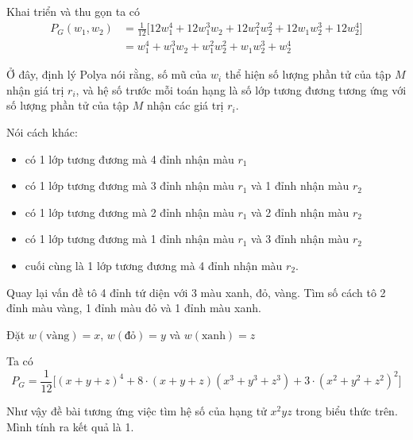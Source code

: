 \begin{example}
    Khai triển và thu gọn ta có
    \begin{align*}
    P_G(w_1, w_2) & = \frac{1}{12} \big[12 w_1^4 + 12 w_1^3 w_2 + 12 w_1^2 w_2^2 + 12 w_1 w_2^3 + 12 w_2^4\big] \\
    & = w_1^4 + w_1^3 w_2 + w_1^2 w_2^2 + w_1 w_2^3 + w_2^4
    \end{align*}

    Ở đây, định lý Polya nói rằng, số mũ của $w_i$ thể hiện số lượng phần tử của tập $M$ nhận giá trị $r_i$,
    và hệ số trước mỗi toán hạng là số lớp tương đương tương ứng với số lượng phần tử của tập $M$ nhận các giá trị $r_i$.

    Nói cách khác:
    \begin{itemize}[noitemsep]
        \item có 1 lớp tương đương mà 4 đỉnh nhận màu $r_1$
        \item có 1 lớp tương đương mà 3 đỉnh nhận màu $r_1$ và 1 đỉnh nhận màu $r_2$
        \item có 1 lớp tương đương mà 2 đỉnh nhận màu $r_1$ và 2 đỉnh nhận màu $r_2$
        \item có 1 lớp tương đương mà 1 đỉnh nhận màu $r_1$ và 3 đỉnh nhận màu $r_2$
        \item cuối cùng là 1 lớp tương đương mà 4 đỉnh nhận màu $r_2$.
    \end{itemize}
\end{example}

Quay lại vấn đề tô 4 đỉnh tứ diện với 3 màu xanh, đỏ, vàng. Tìm số cách tô 2 đỉnh màu vàng, 1 đỉnh màu đỏ và 1 đỉnh màu xanh.

Đặt $w(\text{vàng}) = x$, $w(\text{đỏ}) = y$ và $w(\text{xanh}) = z$

Ta có
\[P_G = \frac{1}{12} \big[(x + y + z)^4 + 8 \cdot (x + y + z) (x^3 + y^3 + z^3) + 3 \cdot (x^2 + y^2 + z^2)^2\big]\]

Như vậy đề bài tương ứng việc tìm hệ số của hạng tử $x^2 yz$ trong biểu thức trên. Mình tính ra kết quả là 1.